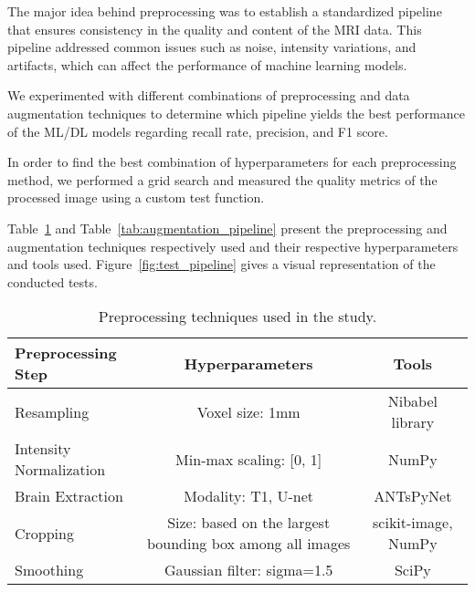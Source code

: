 The major idea behind preprocessing was to establish a standardized pipeline that ensures consistency in the quality and content of the MRI data. This pipeline addressed common issues such as noise, intensity variations, and artifacts, which can affect the performance of machine learning models.

We experimented with different combinations of preprocessing and data augmentation techniques to determine which pipeline yields the best performance of the ML/DL models regarding recall rate, precision, and F1 score.

In order to find the best combination of hyperparameters for each preprocessing method, we performed a grid search and measured the quality metrics of the processed image using a custom test function.

Table~\ref{tab:preprocessing_pipeline} and Table~\ref{tab:augmentation_pipeline} present the preprocessing and augmentation techniques respectively used and their respective hyperparameters and tools used. Figure~\ref{fig:test_pipeline} gives a visual representation of the conducted tests.
%
\begin{center}
    \begin{table}
        \centering
        \caption{\label{tab:preprocessing_pipeline}Preprocessing techniques used in the study.}
        \begin{tabular*}{500pt}{@{\extracolsep\fill}lcc@{\extracolsep\fill}}
            \toprule
            \textbf{Preprocessing Step} & \textbf{Hyperparameters} & \textbf{Tools} \\
            \midrule
            Resampling & Voxel size: 1mm & Nibabel library \\
            Intensity Normalization & Min-max scaling: [0, 1] & NumPy \\
            Brain Extraction & Modality: T1, U-net & ANTsPyNet \\
            Cropping & Size: based on the largest bounding box among all images & scikit-image, NumPy \\
            Smoothing & Gaussian filter: sigma=1.5 & SciPy \\
            \bottomrule
            \end{tabular*}
    \end{table}
\end{center}

